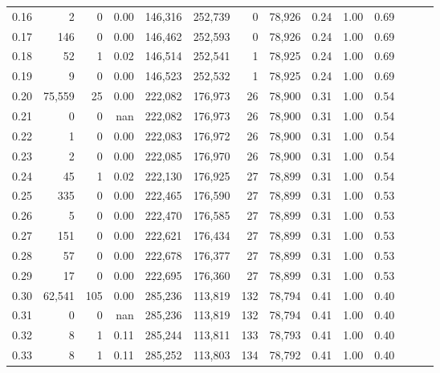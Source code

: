 \begin{tabular}{rrrrrrrrrrrrrr}
0.16 &       2 &       0 &  0.00 &  146,316 &  252,739 &       0 &  78,926 &  0.24 &  1.00 &      0.69 \\
0.17 &     146 &       0 &  0.00 &  146,462 &  252,593 &       0 &  78,926 &  0.24 &  1.00 &      0.69 \\
0.18 &      52 &       1 &  0.02 &  146,514 &  252,541 &       1 &  78,925 &  0.24 &  1.00 &      0.69 \\
0.19 &       9 &       0 &  0.00 &  146,523 &  252,532 &       1 &  78,925 &  0.24 &  1.00 &      0.69 \\
0.20 &  75,559 &      25 &  0.00 &  222,082 &  176,973 &      26 &  78,900 &  0.31 &  1.00 &      0.54 \\
0.21 &       0 &       0 &   nan &  222,082 &  176,973 &      26 &  78,900 &  0.31 &  1.00 &      0.54 \\
0.22 &       1 &       0 &  0.00 &  222,083 &  176,972 &      26 &  78,900 &  0.31 &  1.00 &      0.54 \\
0.23 &       2 &       0 &  0.00 &  222,085 &  176,970 &      26 &  78,900 &  0.31 &  1.00 &      0.54 \\
0.24 &      45 &       1 &  0.02 &  222,130 &  176,925 &      27 &  78,899 &  0.31 &  1.00 &      0.54 \\
0.25 &     335 &       0 &  0.00 &  222,465 &  176,590 &      27 &  78,899 &  0.31 &  1.00 &      0.53 \\
0.26 &       5 &       0 &  0.00 &  222,470 &  176,585 &      27 &  78,899 &  0.31 &  1.00 &      0.53 \\
0.27 &     151 &       0 &  0.00 &  222,621 &  176,434 &      27 &  78,899 &  0.31 &  1.00 &      0.53 \\
0.28 &      57 &       0 &  0.00 &  222,678 &  176,377 &      27 &  78,899 &  0.31 &  1.00 &      0.53 \\
0.29 &      17 &       0 &  0.00 &  222,695 &  176,360 &      27 &  78,899 &  0.31 &  1.00 &      0.53 \\
0.30 &  62,541 &     105 &  0.00 &  285,236 &  113,819 &     132 &  78,794 &  0.41 &  1.00 &      0.40 \\
0.31 &       0 &       0 &   nan &  285,236 &  113,819 &     132 &  78,794 &  0.41 &  1.00 &      0.40 \\
0.32 &       8 &       1 &  0.11 &  285,244 &  113,811 &     133 &  78,793 &  0.41 &  1.00 &      0.40 \\
0.33 &       8 &       1 &  0.11 &  285,252 &  113,803 &     134 &  78,792 &  0.41 &  1.00 &      0.40 \\

\end{tabular}
